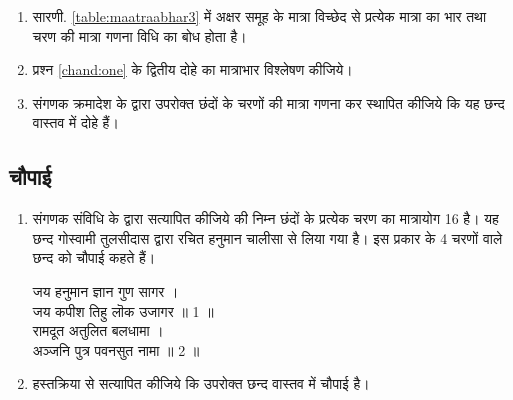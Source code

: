\begin{enumerate}[label=\thesubsection.\arabic*.,ref=\thesubsection.\theenumi]
\item  सारणी. \ref{table:maatraabhar3} में अक्षर समूह के मात्रा विच्छेद से प्रत्येक मात्रा का भार तथा चरण की मात्रा गणना विधि का बोध होता है। 
\begin{table}[!ht]
\centering

\caption{}
\label{table:maatraabhar3}
\end{table}

\item प्रश्न \ref{chand:one} के द्वितीय दोहे का मात्राभार विश्लेषण कीजिये। 
\item संगणक क्रमादेश के द्वारा उपरोक्त छंदों  के चरणों की मात्रा गणना कर स्थापित कीजिये कि यह छन्द वास्तव में दोहे हैं। 
\end{enumerate}

	
\subsection{चौपाई}
\renewcommand{\theequation}{\theenumi}
\renewcommand{\thefigure}{\theenumi}
\begin{enumerate}[label=\thesubsection.\arabic*.,ref=\thesubsection.\theenumi]
\item  संगणक संविधि के द्वारा सत्यापित कीजिये की निम्न छंदों के प्रत्येक चरण का मात्रायोग 16 है।  यह छन्द गोस्वामी तुलसीदास द्वारा रचित हनुमान चालीसा से लिया गया है।   इस प्रकार के 4 चरणों वाले छन्द को चौपाई कहते हैं। 
\begin{center}
जय हनुमान ज्ञान गुण सागर ।
\\
जय कपीश तिहु लॊक उजागर ॥ 1 ॥
\\
रामदूत अतुलित बलधामा ।
\\
अञ्जनि पुत्र पवनसुत नामा ॥ 2 ॥
\end{center}
\item हस्तक्रिया से सत्यापित कीजिये कि उपरोक्त छन्द वास्तव में चौपाई है। 

\end{enumerate}
